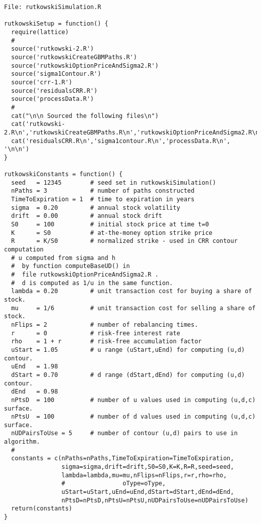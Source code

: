 \documentclass[10pt]{article}
\begin{document}
\begin{verbatim}
File: rutkowskiSimulation.R

rutkowskiSetup = function() {
  require(lattice)
  #
  source('rutkowski-2.R')
  source('rutkowskiCreateGBMPaths.R')
  source('rutkowskiOptionPriceAndSigma2.R')
  source('sigma1Contour.R')
  source('crr-1.R')
  source('residualsCRR.R')
  source('processData.R')
  #
  cat("\n\n Sourced the following files\n")
  cat('rutkowski-2.R\n','rutkowskiCreateGBMPaths.R\n','rutkowskiOptionPriceAndSigma2.R\n')
  cat('residualsCRR.R\n','sigma1contour.R\n','processData.R\n', '\n\n')
}

rutkowskiConstants = function() {
  seed   = 12345        # seed set in rutkowskiSimulation()
  nPaths = 3            # number of paths constructed
  TimeToExpiration = 1  # time to expiration in years
  sigma  = 0.20         # annual stock volatility
  drift  = 0.00         # annual stock drift
  S0     = 100          # initial stock price at time t=0
  K      = S0           # at-the-money option strike price
  R      = K/S0         # normalized strike - used in CRR contour computation
  # u computed from sigma and h
  #  by function computeBaseUD() in
  #  file rutkowskiOptionPriceAndSigma2.R .
  #  d is computed as 1/u in the same function.
  lambda = 0.20         # unit transaction cost for buying a share of stock.
  mu     = 1/6          # unit transaction cost for selling a share of stock.
  nFlips = 2            # number of rebalancing times.
  r      = 0            # risk-free interest rate
  rho    = 1 + r        # risk-free accumulation factor
  uStart = 1.05         # u range (uStart,uEnd) for computing (u,d) contour.
  uEnd   = 1.98
  dStart = 0.70         # d range (dStart,dEnd) for computing (u,d) contour.
  dEnd   = 0.98
  nPtsD  = 100          # number of u values used in computing (u,d,c) surface.
  nPtsU  = 100          # number of d values used in computing (u,d,c) surface.
  nUDPairsToUse = 5     # number of contour (u,d) pairs to use in algorithm.
  #
  constants = c(nPaths=nPaths,TimeToExpiration=TimeToExpiration,
                sigma=sigma,drift=drift,S0=S0,K=K,R=R,seed=seed,
                lambda=lambda,mu=mu,nFlips=nFlips,r=r,rho=rho,
                #                oType=oType,
                uStart=uStart,uEnd=uEnd,dStart=dStart,dEnd=dEnd,
                nPtsD=nPtsD,nPtsU=nPtsU,nUDPairsToUse=nUDPairsToUse)
  return(constants)
}


\end{verbatim}
\end{document}
